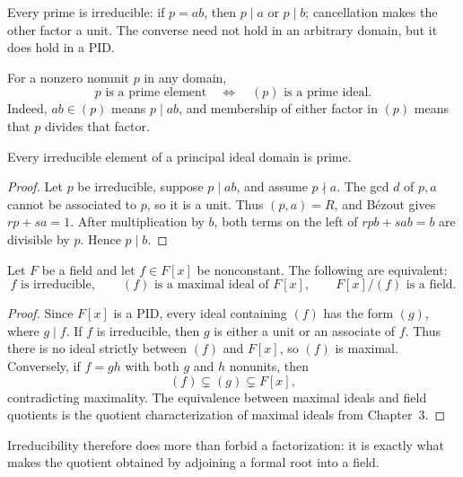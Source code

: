 Every prime is irreducible: if \(p=ab\), then \(p\mid a\) or \(p\mid b\);
cancellation makes the other factor a unit.  The converse need not hold in
an arbitrary domain, but it does hold in a PID.

For a nonzero nonunit \(p\) in any domain,
\[
p\text{ is a prime element}
\quad\Longleftrightarrow\quad
(p)\text{ is a prime ideal}.
\]
Indeed, \(ab\in(p)\) means \(p\mid ab\), and membership of either factor in
\((p)\) means that \(p\) divides that factor.

\begin{proposition}
Every irreducible element of a principal ideal domain is prime.
\end{proposition}
\begin{proof}
Let \(p\) be irreducible, suppose \(p\mid ab\), and assume \(p\nmid a\).
The gcd \(d\) of \(p,a\) cannot be associated to \(p\), so it is a unit.
Thus \((p,a)=R\), and B\'ezout gives \(rp+sa=1\).  After multiplication by
\(b\), both terms on the left of \(rpb+sab=b\) are divisible by \(p\).
Hence \(p\mid b\).
\end{proof}

\begin{applicationtheorem}
\label{thm:irreducible-maximal-field}
Let \(F\) be a field and let \(f\in F[x]\) be nonconstant.  The following are
equivalent:
\[
f\text{ is irreducible},
\qquad
(f)\text{ is a maximal ideal of }F[x],
\qquad
F[x]/(f)\text{ is a field}.
\]
\end{applicationtheorem}
\begin{proof}
Since \(F[x]\) is a PID, every ideal containing \((f)\) has the form
\((g)\), where \(g\mid f\).  If \(f\) is irreducible, then \(g\) is either a
unit or an associate of \(f\).  Thus there is no ideal strictly between
\((f)\) and \(F[x]\), so \((f)\) is maximal.  Conversely, if
\(f=gh\) with both \(g\) and \(h\) nonunits, then
\[
(f)\subsetneq(g)\subsetneq F[x],
\]
contradicting maximality.  The equivalence between maximal ideals and field
quotients is the quotient characterization of maximal ideals from Chapter~3.
\end{proof}

Irreducibility therefore does more than forbid a factorization: it is exactly
what makes the quotient obtained by adjoining a formal root into a field.

